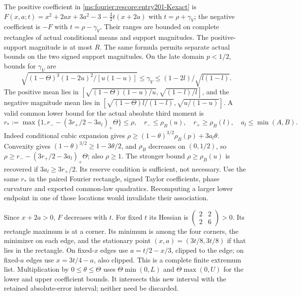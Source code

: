 The positive coefficient in \eqref{ms:fourier:rescore:entry201-Kexact} is
$F(x,a;t)=x^2+2ax+3a^2-3-\tfrac32t(x+2a)$
with $t=\rho+\gamma_V$; the negative coefficient is $-F$
with $t=\rho-\gamma_V$. Their ranges are bounded on complete
rectangles of actual conditional means and support magnitudes.
The positive-support magnitude is at most $R$.
The same formula permits separate actual bounds on the two signed support magnitudes.
On the late domain $p<1/2$, bounds for $\gamma_V$ are
\[
 \sqrt{(1-\Theta)^3(1-2u)^2/[u(1-u)]}
 \le\gamma_V\le(1-2l)/\sqrt{l(1-l)}.
\]
The positive mean lies in
$[\sqrt{(1-\Theta)(1-u)/u},\sqrt{(1-l)/l}]$, and the negative
magnitude mean lies in
$[\sqrt{(1-\Theta)l/(1-l)},\sqrt{u/(1-u)}]$.
A valid common lower bound for the actual absolute third moment is
\begin{equation}\label{ms:fourier:rescore:relaxed-rho}
 r_*:=\max\{1,r_--(3r_+/2-3a_l)_+\Theta\}\le\rho,
 \quad r_-\le\rho_B(u),\quad r_+\ge\rho_B(l),
 \quad a_l\le\min(A,B).
\end{equation}
Indeed conditional cubic expansion gives
$\rho\ge(1-\theta)^{3/2}\rho_B(p)+3a_l\theta$.
Convexity gives $(1-\theta)^{3/2}\ge1-3\theta/2$, and $\rho_B$
decreases on $(0,1/2)$, so
$\rho\ge r_--(3r_+/2-3a_l)_+\Theta$; also $\rho\ge1$.
The stronger bound $\rho\ge\rho_B(u)$ is recovered if
$3a_l\ge3r_+/2$. Its reserve condition is sufficient, not necessary.
Use the same $r_*$ in the paired Fourier rectangle, signed Taylor
coefficients, phase curvature and exported common-law quadratics.
Recomputing a larger lower endpoint in one of those locations would
invalidate their association.

Since $x+2a>0$, $F$ decreases with $t$.
For fixed $t$ its Hessian is
$\left(\begin{smallmatrix}2&2\\2&6\end{smallmatrix}\right)>0$.
Its rectangle maximum is at a corner. Its minimum is among the four
corners, the minimizer on each edge, and the stationary point
$(x,a)=(3t/8,3t/8)$ if that lies in the rectangle.
On fixed-$x$ edges use $a=t/2-x/3$, clipped to the edge; on
fixed-$a$ edges use $x=3t/4-a$, also clipped.
This is a complete finite extremum list.
Multiplication by $0\le\theta\le\Theta$ uses
$\Theta\min(0,L)$ and $\Theta\max(0,U)$ for the lower and upper
coefficient bounds. It intersects this new interval with the retained
absolute-error interval; neither need be discarded.

